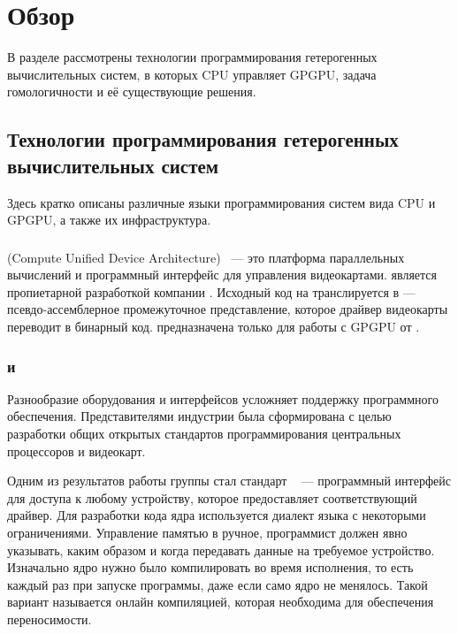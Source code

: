 \section{Обзор}
В разделе рассмотрены технологии программирования 
гетерогенных вычислительных систем, в которых CPU управляет GPGPU,
задача гомологичности и её существующие решения.

\subsection[Технологии программирования гетерогенных систем] {Технологии программирования гетерогенных\\вычислительных систем}
Здесь кратко описаны различные языки программирования систем вида 
CPU и GPGPU, а также их инфраструктура.

\subsubsection{}
 (Compute Unified Device Architecture)~\cite{CUDA} --- 
это платформа параллельных вычислений и программный интерфейс 
для управления видеокартами.
 является пропиетарной разработкой компании .
Исходный код на  транслируется в  ---
псевдо-ассемблерное промежуточное представление, 
которое драйвер видеокарты переводит в бинарный код.
 предназначена только для работы с GPGPU от .

\subsubsection{ и }
Разнообразие оборудования и интерфейсов усложняет поддержку
программного обеспечения.
Представителями индустрии была сформирована  с целью
разработки общих открытых стандартов программирования центральных процессоров 
и видеокарт.

Одним из результатов работы группы стал стандарт 
~\cite{OpenCL} --- программный интерфейс для доступа к любому
устройству, которое предоставляет соответствующий драйвер.
Для разработки кода ядра используется диалект
языка  с некоторыми ограничениями.
Управление памятью в  ручное, программист должен явно указывать,
каким образом и когда передавать данные на требуемое устройство.
Изначально ядро нужно было компилировать во время исполнения, 
то есть каждый раз при запуске программы, даже если само ядро не менялось.
Такой вариант называется онлайн компиляцией, которая необходима для 
обеспечения переносимости.

